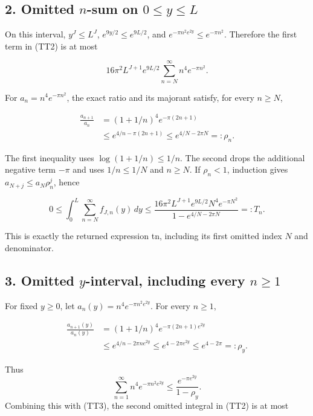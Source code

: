 \subsection{\texorpdfstring{2. Omitted \(n\)-sum on \(0\le y\le L\)}{2. Omitted n-sum on 0\textbackslash le y\textbackslash le L}}\label{omitted-n-sum-on-0le-yle-l}

On this interval, \(y^J\le L^J\), \(e^{9y/2}\le e^{9L/2}\), and \(e^{-\pi n^2e^{2y}}\le e^{-\pi n^2}\). Therefore the first term in (TT2) is at most

\[
16\pi^2L^{J+1}e^{9L/2}
\sum_{n=N}^\infty n^4e^{-\pi n^2}.
\tag{TT4}
\]

For \(a_n=n^4e^{-\pi n^2}\), the exact ratio and its majorant satisfy, for every \(n\ge N\),

\[
\begin{aligned}
\frac{a_{n+1}}{a_n}
&=(1+1/n)^4e^{-\pi(2n+1)}\\
&\le e^{4/n-\pi(2n+1)}
\le e^{4/N-2\pi N}=:\rho_n.
\end{aligned}
\tag{TT5}
\]

The first inequality uses \(\log(1+1/n)\le1/n\). The second drops the additional negative term \(-\pi\) and uses \(1/n\le1/N\) and \(n\ge N\). If \(\rho_n<1\), induction gives \(a_{N+j}\le a_N\rho_n^j\), hence

\[
\boxed{
0\le\int_0^L\sum_{n=N}^{\infty}f_{J,n}(y)\,dy
\le
\frac{16\pi^2L^{J+1}e^{9L/2}N^4e^{-\pi N^2}}
{1-e^{4/N-2\pi N}}
=:T_n.}
\tag{TT6}
\]

This is exactly the returned expression tn, including its first omitted index \(N\) and denominator.

\subsection{\texorpdfstring{3. Omitted \(y\)-interval, including every \(n\ge1\)}{3. Omitted y-interval, including every n\textbackslash ge1}}\label{omitted-y-interval-including-every-nge1}

For fixed \(y\ge0\), let \(a_n(y)=n^4e^{-\pi n^2e^{2y}}\). For every \(n\ge1\),

\[
\begin{aligned}
\frac{a_{n+1}(y)}{a_n(y)}
&=(1+1/n)^4e^{-\pi(2n+1)e^{2y}}\\
&\le e^{4/n-2\pi n e^{2y}}
\le e^{4-2\pi e^{2y}}
\le e^{4-2\pi}=:\rho_y.
\end{aligned}
\tag{TT7}
\]

Thus \[
\sum_{n=1}^{\infty}n^4e^{-\pi n^2e^{2y}}
\le \frac{e^{-\pi e^{2y}}}{1-\rho_y}.
\] Combining this with (TT3), the second omitted integral in (TT2) is at most

